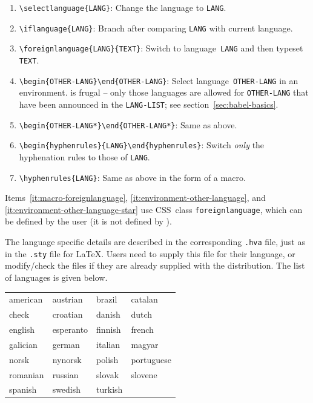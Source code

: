 \begin{enumerate}
\item \verb+\selectlanguage{LANG}+: Change the language
to \verb+LANG+.

\item \verb+\iflanguage{LANG}+: Branch after comparing \verb+LANG+
with current language.

\item \label{it:macro-foreignlanguage}%
\verb+\foreignlanguage{LANG}{TEXT}+: Switch to
language~\verb+LANG+ and then typeset \verb+TEXT+.

\item \label{it:environment-other-language}%
\verb+\begin{OTHER-LANG}+\quad\verb+\end{OTHER-LANG}+: Select
language~\verb+OTHER-LANG+ in an environment.  \hevea{} is frugal --
only those languages are allowed for \verb+OTHER-LANG+ that have been
announced in the \verb+LANG-LIST+; see section~\ref{sec:babel-basics}.

\item \label{it:environment-other-language-star}%
\verb+\begin{OTHER-LANG*}+\quad\verb+\end{OTHER-LANG*}+: Same as above.

\item \verb+\begin{hyphenrules}{LANG}+\quad\verb+\end{hyphenrules}+:
Switch \emph{only} the hyphenation rules to those of \verb+LANG+.

\item \verb+\hyphenrules{LANG}+: Same as above in the form of a macro.
\end{enumerate}

Items~\ref{it:macro-foreignlanguage}, \ref{it:environment-other-language},
and \ref{it:environment-other-language-star} use
CSS~class \verb+foreignlanguage+, which can be defined by the user (it
is not defined by \hevea).

The language specific details are described in the
corresponding \verb+.hva+ file, just as in the \verb+.sty+ file
for \LaTeX. Users need to supply this file for their language, or
modify/check the files if they are already supplied with the
distribution. The list of languages is given below.

\begin{center}
\begin{tabular}{|l|l|l|l|}
\hline
american & austrian & brazil & catalan \\
check & croatian & danish & dutch \\
english & esperanto & finnish & french \\
galician & german & italian & magyar \\
norsk & nynorsk & polish & portuguese \\
romanian & russian & slovak & slovene \\
spanish & swedish & turkish & \\
\hline
\end{tabular}
\end{center}


